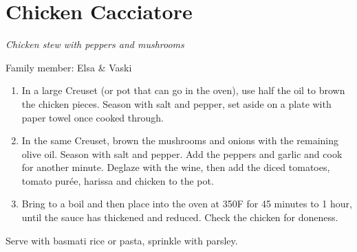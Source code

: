 \chapter{Chicken Cacciatore}
\label{ch:chickencacciatore}


\textit{Chicken stew with peppers and mushrooms}

Family member: Elsa \& Vaski

\begin{enumerate}
    \item In a large Creuset (or pot that can go in the oven), use half the oil to brown the chicken pieces. Season with salt and pepper, set aside on a plate with paper towel once cooked through.
    \item In the same Creuset, brown the mushrooms and onions with the remaining olive oil. Season with salt and pepper. Add the peppers and garlic and cook for another minute. Deglaze with the wine, then add the diced tomatoes, tomato purée, harissa and chicken to the pot.
    \item Bring to a boil and then place into the oven at 350\degree F for 45 minutes to 1 hour, until the sauce has thickened and reduced. Check the chicken for doneness.

\end{enumerate}

Serve with basmati rice or pasta, sprinkle with parsley.
